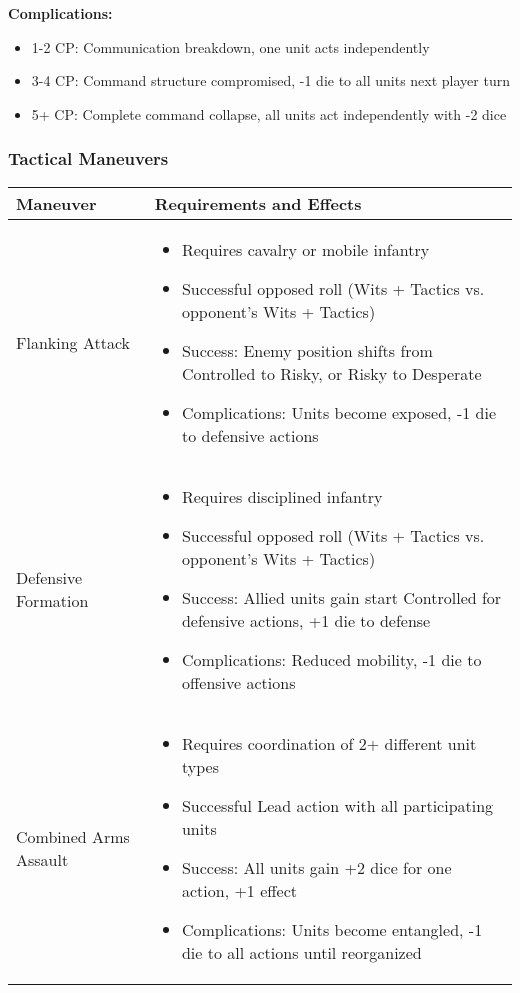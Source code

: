 \textbf{Complications:}
\begin{itemize}[leftmargin=*]
    \item 1-2 CP: Communication breakdown, one unit acts independently
    \item 3-4 CP: Command structure compromised, -1 die to all units next player turn
    \item 5+ CP: Complete command collapse, all units act independently with -2 dice
\end{itemize}

\subsubsection{Tactical Maneuvers}
\begin{longtable}{|>{\raggedright\arraybackslash}p{4cm}|>{\raggedright\arraybackslash}p{8cm}|}
\hline
\textbf{Maneuver} & \textbf{Requirements and Effects} \\
\hline
Flanking Attack & 
\begin{itemize}
    \item Requires cavalry or mobile infantry
    \item Successful opposed roll (Wits + Tactics vs. opponent's Wits + Tactics)
    \item Success: Enemy position shifts from Controlled to Risky, or Risky to Desperate
    \item Complications: Units become exposed, -1 die to defensive actions
\end{itemize} \\
\hline
Defensive Formation & 
\begin{itemize}
    \item Requires disciplined infantry
    \item Successful opposed roll (Wits + Tactics vs. opponent's Wits + Tactics)
    \item Success: Allied units gain start Controlled for defensive actions, +1 die to defense
    \item Complications: Reduced mobility, -1 die to offensive actions
\end{itemize} \\
\hline
Combined Arms Assault & 
\begin{itemize}
    \item Requires coordination of 2+ different unit types
    \item Successful Lead action with all participating units
    \item Success: All units gain +2 dice for one action, +1 effect
    \item Complications: Units become entangled, -1 die to all actions until reorganized
\end{itemize} \\
\hline
\end{longtable}

